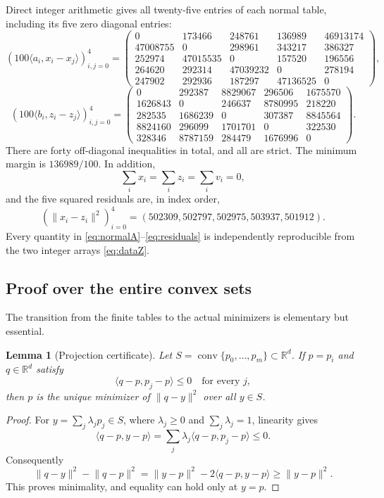 \documentclass[11pt,a4paper]{article}
\newtheorem{lemma}[theorem]{Lemma}
\theoremstyle{remark}
\newcommand{\R}{\mathbb R}
\newcommand{\conv}{\operatorname{conv}}
\newcommand{\ip}[2]{\langle #1,#2\rangle}
\newcommand{\norm}[1]{\lVert #1\rVert}
\begin{document}
Direct integer arithmetic gives all twenty-five entries of each normal table, including its five zero diagonal entries:
\begin{equation}\label{eq:marginC}
\left(100\ip{a_i}{x_i-x_j}\right)_{i,j=0}^4=
\begin{pmatrix}
0&173466&248761&136989&46913174\\
47008755&0&298961&343217&386327\\
252974&47015535&0&157520&196556\\
264620&292314&47039232&0&278194\\
247902&292936&187297&47136525&0
\end{pmatrix},
\end{equation}
\begin{equation}\label{eq:marginD}
\left(100\ip{b_i}{z_i-z_j}\right)_{i,j=0}^4=
\begin{pmatrix}
0&292387&8829067&296506&1675570\\
1626843&0&246637&8780995&218220\\
282535&1686239&0&307387&8845564\\
8824160&296099&1701701&0&322530\\
328346&8787159&284479&1676996&0
\end{pmatrix}.
\end{equation}
There are forty off-diagonal inequalities in total, and all are strict. The minimum margin is $136989/100$. In addition,
\begin{equation}\label{eq:centroids}
\sum_i x_i=\sum_i z_i=\sum_i v_i=0,
\end{equation}
and the five squared residuals are, in index order,
\begin{equation}\label{eq:residuals}
(\norm{x_i-z_i}^2)_{i=0}^4=(502309,502797,502975,503937,501912).
\end{equation}
Every quantity in \eqref{eq:normalA}--\eqref{eq:residuals} is independently reproducible from the two integer arrays \eqref{eq:dataZ}.

\subsection{Proof over the entire convex sets}
The transition from the finite tables to the actual minimizers is elementary but essential.
\begin{lemma}[Projection certificate]\label{lem:projection}
Let $S=\conv\{p_0,\ldots,p_m\}\subset\R^d$. If $p=p_i$ and $q\in\R^d$ satisfy
\[
\ip{q-p}{p_j-p}\le0\quad\text{for every }j,
\]
then $p$ is the unique minimizer of $\norm{q-y}^2$ over all $y\in S$.
\end{lemma}
\begin{proof}
For $y=\sum_j\lambda_j p_j\in S$, where $\lambda_j\ge0$ and $\sum_j\lambda_j=1$, linearity gives
\[
\ip{q-p}{y-p}=\sum_j\lambda_j\ip{q-p}{p_j-p}\le0.
\]
Consequently
\begin{equation}\label{eq:projectionidentity}
\norm{q-y}^2-\norm{q-p}^2
=\norm{y-p}^2-2\ip{q-p}{y-p}\ge\norm{y-p}^2.
\end{equation}
This proves minimality, and equality can hold only at $y=p$.
\end{proof}
\end{document}
